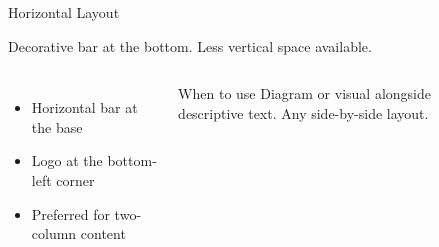 \documentclass[aspectratio=169,t,xcolor=table]{beamer}
\begin{document}
\begin{frame}{Horizontal Layout}

    Decorative bar at the bottom. Less vertical space available.

    \begin{columns}
        \begin{itemize}
            \item Horizontal bar at the base
            \item Logo at the bottom-left corner
            \item Preferred for two-column content
        \end{itemize}

        \vspace{0.5em}
        \begin{block}{When to use}
            Diagram or visual alongside descriptive text. Any side-by-side layout.
        \end{block}

        \begin{center}
        \end{center}
    \end{columns}

\end{frame}
\end{document}
